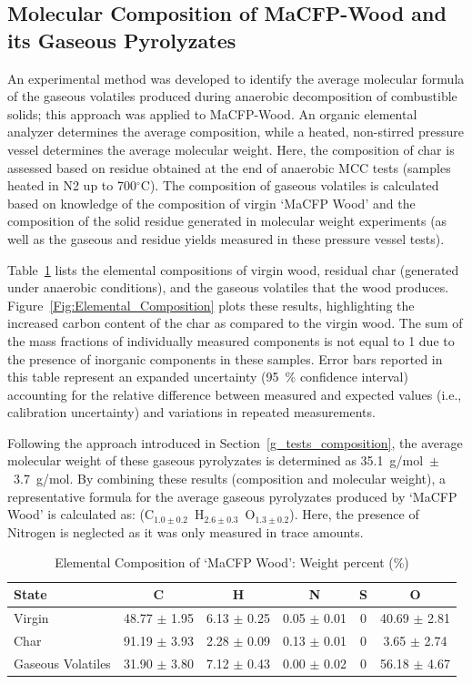 \documentclass{book}
\begin{document}
\clearpage

\subsection{Molecular Composition of MaCFP-Wood and its Gaseous Pyrolyzates}
An experimental method was developed to identify the average molecular formula of the gaseous volatiles produced during anaerobic decomposition of combustible solids; this approach was applied to MaCFP-Wood. An organic elemental analyzer determines the average composition, while a heated, non-stirred pressure vessel determines the average molecular weight. Here, the composition of char is assessed based on residue   obtained at the end of anaerobic MCC tests (samples heated in N2 up to 700$^\circ$C). The composition of gaseous volatiles is calculated based on knowledge of the composition of virgin `MaCFP Wood' and the composition of the solid residue generated in molecular weight experiments (as well as the gaseous and residue yields measured in these pressure vessel tests).

Table~\ref{Tab:Elemental_Composition} lists the elemental compositions of virgin wood, residual char (generated under anaerobic conditions), and the gaseous volatiles that the wood produces. Figure~\ref{Fig:Elemental_Composition} plots these results, highlighting the increased carbon content of the char as compared to the virgin wood. The sum of the mass fractions of individually measured components is not equal to 1 due to the presence of inorganic components in these samples. Error bars reported in this table represent an expanded uncertainty (95~\% confidence interval) accounting for the relative difference between measured and expected values (i.e., calibration uncertainty) and variations in repeated measurements.

Following the approach introduced in Section~\ref{g_tests_composition}, the average molecular weight of these gaseous pyrolyzates is determined as 35.1~g/mol~$\pm$~3.7~g/mol. By combining these results (composition and molecular weight), a representative formula for the average gaseous pyrolyzates produced by `MaCFP Wood' is calculated as: (C$_{1.0\pm0.2}$~H$_{2.6\pm0.3}$~O$_{1.3\pm0.2}$). Here, the presence of Nitrogen is neglected as it was only measured in trace amounts.

\begin{table}[h]
    \centering
    \caption{Elemental Composition of `MaCFP Wood': Weight percent (\%)}
    \begin{tabular}{l c c c c c}
        \hline
        \textbf{State} & \textbf{C} & \textbf{H} & \textbf{N} & \textbf{S} & \textbf{O} \\
        \hline
        Virgin & 48.77 $\pm$ 1.95 & 6.13 $\pm$ 0.25 & 0.05 $\pm$ 0.01 & 0 & 40.69 $\pm$ 2.81 \\
        Char   & 91.19 $\pm$ 3.93 & 2.28 $\pm$ 0.09 & 0.13 $\pm$ 0.01 & 0 & 3.65 $\pm$ 2.74  \\
        Gaseous Volatiles & 31.90 $\pm$ 3.80 & 7.12 $\pm$ 0.43 & 0.00 $\pm$ 0.02 & 0 & 56.18 $\pm$ 4.67 \\
	\hline
    \end{tabular}
    \label{Tab:Elemental_Composition}
\end{table}
\end{document}
